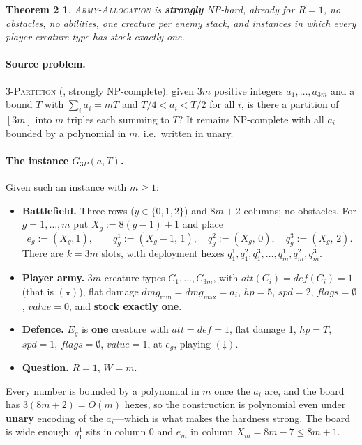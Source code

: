 \documentclass[11pt,a4paper]{article}
\theoremstyle{plain}
\newtheorem*{thmtwo}{Theorem 2}
\theoremstyle{definition}
\theoremstyle{plain}
\theoremstyle{definition}
\theoremstyle{remark}
\newcommand{\ALLOC}{\textsc{Army-Allocation}}
\newcommand{\THREEPART}{\textsc{3-Partition}}
\begin{document}
\begin{thmtwo}
\ALLOC{} is \textbf{strongly} NP-hard, already for $R=1$, no obstacles, no abilities, one
creature per enemy stack, and instances in which every player creature type has stock exactly
one.
\end{thmtwo}

\paragraph{Source problem.} \THREEPART{} (\cite[SP15]{GJ79}, strongly NP-complete): given
$3m$ positive integers $a_1,\dots,a_{3m}$ and a bound $T$ with $\sum_i a_i=mT$ and
$T/4<a_i<T/2$ for all $i$, is there a partition of $[3m]$ into $m$ triples each summing to
$T$? It remains NP-complete with all $a_i$ bounded by a polynomial in $m$, i.e.\ written in
unary.

\paragraph{The instance $G_{3P}(a,T)$.} Given such an instance with $m\ge 1$:

\begin{itemize}
\item \textbf{Battlefield.} Three rows ($y\in\{0,1,2\}$) and $8m+2$ columns; no obstacles.
  For $g=1,\dots,m$ put $X_g:=8(g-1)+1$ and place
  \[
    e_g:=(X_g,1),\qquad
    q_g^1:=(X_g-1,\,1),\quad q_g^2:=(X_g,\,0),\quad q_g^3:=(X_g,\,2).
  \]
  There are $k=3m$ slots, with deployment hexes
  $q_1^1,q_1^2,q_1^3,\dots,q_m^1,q_m^2,q_m^3$.
\item \textbf{Player army.} $3m$ creature types $C_1,\dots,C_{3m}$, with
  $\mathit{att}(C_i)=\mathit{def}(C_i)=1$ (that is $(\star)$), flat damage
  $\mathit{dmg}_{\min}=\mathit{dmg}_{\max}=a_i$, $\mathit{hp}=5$, $\mathit{spd}=2$,
  $\mathit{flags}=\emptyset$, $\mathit{value}=0$, and \textbf{stock exactly one}.
\item \textbf{Defence.} $E_g$ is \textbf{one} creature with $\mathit{att}=\mathit{def}=1$,
  flat damage 1, $\mathit{hp}=T$, $\mathit{spd}=1$, $\mathit{flags}=\emptyset$,
  $\mathit{value}=1$, at $e_g$, playing $(\ddagger)$.
\item \textbf{Question.} $R=1$, $W=m$.
\end{itemize}

\noindent Every number is bounded by a polynomial in $m$ once the $a_i$ are, and the board
has $3(8m+2)=O(m)$ hexes, so the construction is polynomial even under \textbf{unary}
encoding of the $a_i$---which is what makes the hardness strong. The board is wide enough:
$q_1^1$ sits in column $0$ and $e_m$ in column $X_m=8m-7\le 8m+1$.
\end{document}
